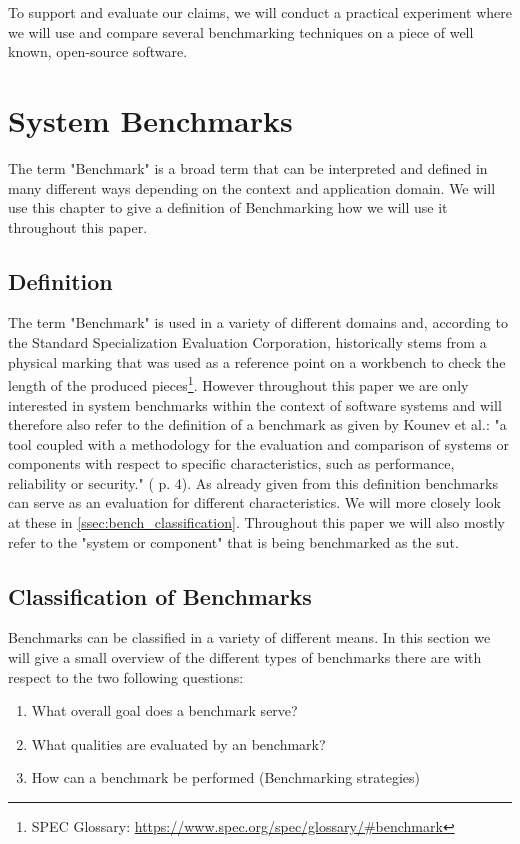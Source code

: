 \documentclass[	runningheads,
				a4paper]{llncs}
\begin{document}
To support and evaluate our claims, we will conduct a practical experiment where we will use and compare several benchmarking techniques on a piece of well known, open-source software.

\section{System Benchmarks}
\label{sec:benchmarking}
The term "Benchmark" is a broad term that can be interpreted and defined in many different ways depending on the context and application domain. We will use this chapter to give a definition of Benchmarking how we will use it throughout this paper.

\subsection{Definition}
\label{ssec:bench_definition}
The term "Benchmark" is used in a variety of different domains and, according to the Standard Specialization Evaluation Corporation, historically stems from a physical marking that was used as a reference point on a workbench to check the length of the produced pieces\footnote{SPEC Glossary: \url{https://www.spec.org/spec/glossary/\#benchmark}}. However throughout this paper we are only interested in system benchmarks within the context of software systems and will therefore also refer to the definition of a benchmark as given by Kounev et al.: "a tool coupled with a methodology for the evaluation and comparison of systems or components with respect to specific characteristics, such as performance, reliability or security." (\cite{Kounev} p. 4). As already given from this definition benchmarks can serve as an evaluation for different characteristics. We will more closely look at these in \autoref{ssec:bench_classification}. Throughout this paper we will also mostly refer to the "system or component" that is being benchmarked as the \gls{sut}.

\subsection{Classification of Benchmarks}
\label{ssec:bench_classification}
Benchmarks can be classified in a variety of different means. In this section we will give a small overview of the different types of benchmarks there are with respect to the two following questions:
\begin{enumerate}
	\item What overall goal does a benchmark serve?
	\item What qualities are evaluated by an benchmark?
	\item How can a benchmark be performed (Benchmarking strategies)
\end{enumerate}
\end{document}
